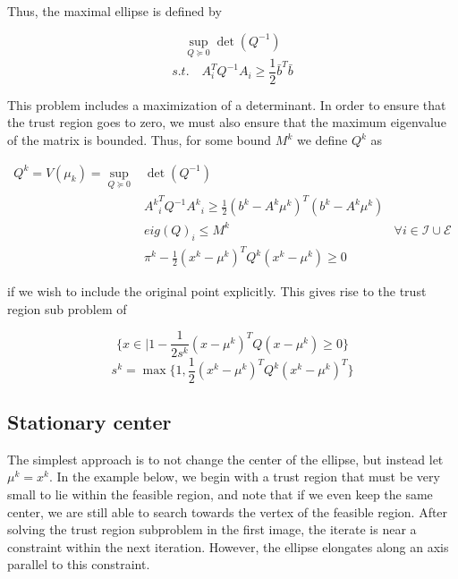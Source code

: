 \documentclass{article}
\begin{document}
Thus, the maximal ellipse is defined by

\[
\sup_{Q \succeq 0} \det(Q^{-1})
\]
\[
s.t. \quad A_i^T Q^{-1} A_i \ge \frac 1 2 \bar{b}^T\bar{b}
\]


This problem includes a maximization of a determinant.
In order to ensure that the trust region goes to zero, we must also ensure that the maximum eigenvalue of the matrix is bounded.
Thus, for some bound $M^k$ we define $Q^k$ as

\begin{center}
\begin{align}
\label{ellipse_1}
Q^k = V(\mu_k) = \sup_{Q \succeq 0} & \det(Q^{-1}) & \\
  & {A^k}_i^T Q^{-1} {A^k}_i \ge \frac 1 2 (b^k - A^k\mu^{k})^T(b^k - A^k \mu^{k}) & \\
  & eig(Q)_i \le M^k & \forall i \in \mathcal I \cup \mathcal E \\
  & \pi^k - \frac 1 2 (x^k - \mu^{k})^TQ^{k}(x^k - \mu^{k}) \ge 0
\end{align}
\end{center}

if we wish to include the original point explicitly.
This gives rise to the trust region sub problem of

$$\{x \in \mathbb | 1 - \frac 1 {2s^k} (x - \mu^{k})^T Q (x - \mu^{k}) \ge 0\} $$
$$s^k = \max \{1, \frac 1 {2} (x^{k} - \mu^{k})^T Q^k (x^{k} - \mu^{k})^T \}$$






\subsection{Stationary center}
The simplest approach is to not change the center of the ellipse, but instead let $\mu^k = x^k$.
In the example below, we begin with a trust region that must be very small to lie within the feasible region, and note that if we even keep the same center, we are still able to search towards the vertex of the feasible region.
After solving the trust region subproblem in the first image, the iterate is near a constraint within the next iteration.
However, the ellipse elongates along an axis parallel to this constraint.
\end{document}
